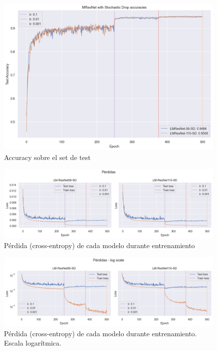 \documentclass[titlepage,a4paper,oneside]{article}
\begin{document}
\begin{figure}[H]
\centering
\includegraphics[width=\textwidth]{images/accuracy_sd.png}
\caption{Accuracy sobre el set de test}
\label{sd_test_set_acc}
\end{figure}

\begin{figure}[H]
\centering
\includegraphics[width=\textwidth]{images/loss_sd.png}
\caption{Pérdida (cross-entropy) de cada modelo durante entrenamiento}
\label{train_loss_sd}
\end{figure}

\begin{figure}[H]
\centering
\includegraphics[width=\textwidth]{images/loss_log_sd.png}
\caption{Pérdida (cross-entropy) de cada modelo durante entrenamiento. Escala logarítmica.}
\label{train_loss_log_sd}
\end{figure}
\end{document}
